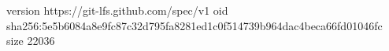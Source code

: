 version https://git-lfs.github.com/spec/v1
oid sha256:5e5b6084a8e9fc87c32d795fa8281ed1c0f514739b964dac4beca66fd01046fc
size 22036
